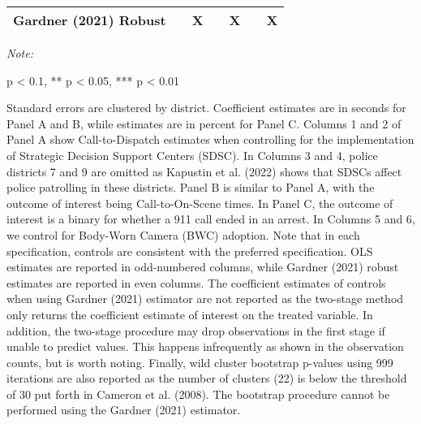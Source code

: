 \begin{table}[H]
\begin{threeparttable}
\begin{tabular}[t]{lcccccc}
\midrule
Gardner (2021) Robust &  & X &  & X &  & X\\
\bottomrule
\end{tabular}
\begin{tablenotes}
\item \textit{Note: } 
\item * p < 0.1, ** p < 0.05, *** p < 0.01
\item Standard errors are clustered by district.                      Coefficient estimates are in seconds for Panel A and B,                      while estimates are in percent for Panel C.                      Columns 1 and 2 of Panel A show                       Call-to-Dispatch estimates when controlling for the implementation                      of Strategic                      Decision Support Centers (SDSC). In Columns 3 and 4,                       police districts 7 and 9 are omitted as Kapustin et al. (2022) shows that SDSCs                       affect                      police patrolling in these districts. Panel B is similar to Panel A,                      with the outcome of interest being Call-to-On-Scene times. In Panel C, the outcome of                      interest is a binary for whether a 911 call ended in an arrest. In Columns 5 and 6,                      we control for Body-Worn Camera (BWC) adoption. Note that in each specification,                      controls are consistent with the preferred specification. OLS estimates are reported                      in odd-numbered columns, while Gardner (2021) robust estimates are reported in even columns.                      The coefficient estimates of controls when using Gardner (2021) estimator are not reported as the                       two-stage method only returns the coefficient estimate of interest on                      the treated variable. In addition, the two-stage procedure may drop observations                      in the first stage if unable to predict values. This happens infrequently as shown                      in the observation counts, but is worth noting. Finally,                      wild cluster bootstrap p-values using 999 iterations are also reported                  as the number of clusters (22) is below the threshold of 30 put forth in                  Cameron et al. (2008). The bootstrap procedure cannot be performed using the Gardner (2021) estimator.                                                           
\end{tablenotes}
\end{threeparttable}
\end{table}
